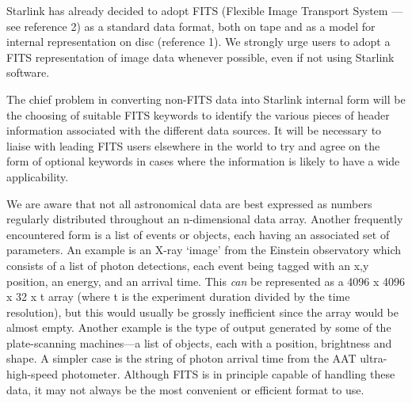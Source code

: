 Starlink has already decided to adopt FITS (Flexible Image Transport System ---
see reference 2) as a standard data format, both on tape and as a model for
internal representation on disc (reference 1).
We strongly urge users to adopt a FITS representation of image data whenever
possible, even if not using Starlink software.

The chief problem in converting non-FITS data into Starlink internal form will
be the choosing of suitable FITS keywords to identify the various pieces of
header information associated with the different data sources.
It will be necessary to liaise with leading FITS users elsewhere in the world
to try and agree on the form of optional keywords in cases where the
information is likely to have a wide applicability.

We are aware that not all astronomical data are best expressed as numbers
regularly distributed throughout an n-dimensional data array.
Another frequently encountered form is a list of events or objects, each having
an associated set of parameters.
An example is an X-ray `image' from the Einstein observatory which consists of
a list of photon detections, each event being tagged with an x,y position, an
energy, and an arrival time.
This {\em can} be represented as a 4096 x 4096 x 32 x t array (where t is the
experiment duration divided by the time resolution), but this would usually be
grossly inefficient since the array would be almost empty.
Another example is the type of output generated by some of the plate-scanning
machines---a list of objects, each with a position, brightness and shape.
A simpler case is the string of photon arrival time from the AAT
ultra-high-speed photometer.
Although FITS is in principle capable of handling these data, it may not always
be the most convenient or efficient format to use.

